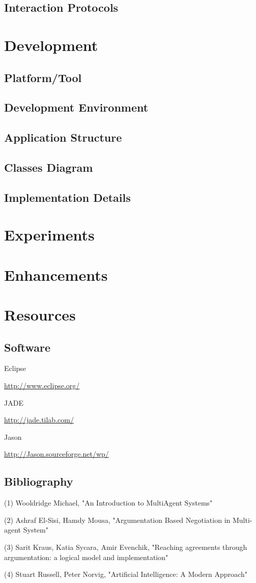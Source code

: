 \documentclass{article}
\begin{document}
\subsection{Interaction Protocols}
\section{Development}
\subsection{Platform/Tool}
\subsection{Development Environment}
\subsection{Application Structure}
\subsection{Classes Diagram}
\subsection{Implementation Details}
\section{Experiments}
\section{Enhancements}
\section{Resources}

\subsection{Software}
Eclipse \par
\url{http://www.eclipse.org/} \par
\vspace{3mm}
JADE \par
\url{http://jade.tilab.com/} \par 
\vspace{3mm}
Jason \par
\url{http://Jason.sourceforge.net/wp/} \par 

\subsection{Bibliography}
\noindent
(1) Wooldridge Michael, "An Introduction to MultiAgent Systems"

\noindent
(2) Ashraf El-Sisi, Hamdy Mousa, "Argumentation Based Negotiation in Multi-agent System"

\noindent
(3) Sarit Kraus, Katia Sycara, Amir Evenchik, "Reaching agreements through argumentation: a logical model and implementation"

\noindent
(4) Stuart Russell, Peter Norvig, "Artificial Intelligence: A Modern Approach"
\end{document}
